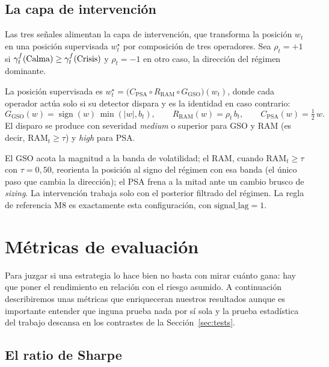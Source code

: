\subsection{La capa de intervención}
\label{sec:strata-intervencion}

Las tres señales alimentan la capa de intervención, que transforma la posición $w_t$ en una posición supervisada $w_t^{\star}$ por composición de tres operadores. Sea $\rho_t = +1$ si $\gamma^{f}_t(\text{Calma}) \ge \gamma^{f}_t(\text{Crisis})$ y $\rho_t = -1$ en otro caso, la dirección del régimen dominante.

\begin{definicion}
\label{def:m8}
La posición supervisada es $w_t^{\star} = \big(C_{\mathrm{PSA}} \circ R_{\mathrm{RAM}} \circ G_{\mathrm{GSO}}\big)(w_t)$, donde cada operador actúa solo si su detector dispara y es la identidad en caso contrario:
\[
G_{\mathrm{GSO}}(w) = \operatorname{sign}(w)\,\min(|w|, b_t),
\qquad
R_{\mathrm{RAM}}(w) = \rho_t\, b_t,
\qquad
C_{\mathrm{PSA}}(w) = \tfrac{1}{2}\, w.
\]
El disparo se produce con severidad \emph{medium} o superior para GSO y RAM (es decir, $\mathrm{RAM}_t \ge \tau$) y \emph{high} para PSA.
\end{definicion}

El GSO acota la magnitud a la banda de volatilidad; el RAM, cuando $\mathrm{RAM}_t \ge \tau$ con $\tau = 0{,}50$, reorienta la posición al signo del régimen con esa banda (el único paso que cambia la dirección); el PSA frena a la mitad ante un cambio brusco de \emph{sizing}. La intervención trabaja solo con el posterior filtrado del régimen. La regla de referencia M8 es exactamente esta configuración, con $\mathrm{signal\_lag} = 1$.

\section{Métricas de evaluación}
\label{sec:metricas}

Para juzgar si una estrategia lo hace bien no basta con mirar cuánto gana: hay que poner el rendimiento en relación con el riesgo asumido. A continuación describiremos unas métricas que enriqueceran nuestros resultados aunque es importante entender que inguna prueba nada por sí sola y la prueba estadística del trabajo descansa en los contrastes de la Sección~\ref{sec:tests}.

\subsection{El ratio de Sharpe}
\label{sec:economia-sharpe}


